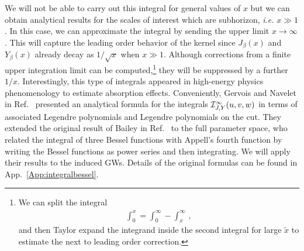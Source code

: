 \documentclass[aps,10pt,prd,groupedaddress,nofootinbib,notitlepage,eqsecnum,preprintnumbers]{revtex4-1}
\begin{document}
We will not be able to carry out this integral for general values of $x$ but we can obtain analytical results
for the scales of interest which are subhorizon, \textit{i.e.} $x\gg1$. In this case, we can approximate the integral by sending the upper limit $x\to\infty$. This will capture the leading order behavior of the kernel since $J_\beta(x)$ and $Y_\beta(x)$ already decay as $1/\sqrt{x}$ when $x\gg 1$. Although corrections from a finite upper integration limit can be computed,\footnote{We can split the integral
\begin{align}
\int_0^x=\int_0^\infty-\int_x^\infty\,,\nonumber
\end{align}
and then Taylor expand the integrand inside the second integral for large $\tilde x$ to estimate the next to leading order correction.} they will be suppressed by a further $1/x$. Interestingly, this type of integrals appeared in high-energy physics phenomenology to estimate absorption effects. Conveniently, Gervois and Navelet in Ref.~\cite{threebesselI} presented an analytical formula for the integrals ${\cal I}^\infty_{J,Y}(u,v,w)$ in terms of associated Legendre polynomials and Legendre polynomials on the cut. They extended the original result of Bailey in Ref.~\cite{originalbessel} to the full parameter space, who related the integral of three Bessel functions with Appell's fourth function by writing the Bessel functions as power series and then integrating. We will apply their results to the induced GWs. Details of the original formulas can be found in App.~\ref{App:integralbessel}. 
\end{document}
